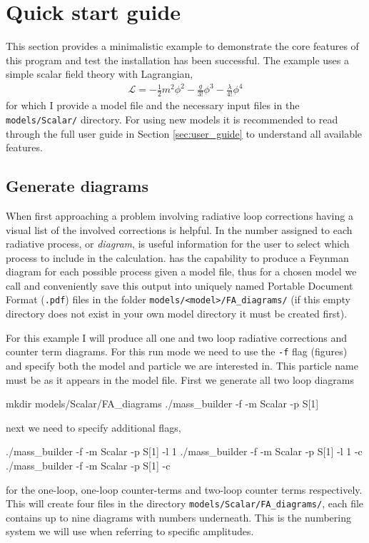\section{Quick start guide}

This section provides a minimalistic example to demonstrate the core features of this program and test the installation has been successful.  The example uses a simple scalar field theory with Lagrangian,
\begin{align}
\mathcal{L} = -\frac{1}{2}m^2\phi^2 - \frac{g}{3!}\phi^3-\frac{\lambda}{4!}\phi^4
\end{align}
for which I provide a \feynarts model file and the necessary \mb input files in the \lstinline{models/Scalar/} directory.  For using new models it is recommended to read through the full user guide in Section \ref{sec:user_guide} to understand all available features.

\subsection{Generate \feynarts diagrams}\label{generate_diagrams}

When first approaching a problem involving radiative loop corrections having a visual list of the involved corrections is helpful.  In \mb the number assigned to each radiative process, or \textit{diagram}, is useful information for the user to select which process to include in the calculation.  \feynarts has the capability to produce a Feynman diagram for each possible process given a model file, thus for a chosen model we call \feynarts and conveniently save this output into uniquely named Portable Document Format (\lstinline{.pdf}) files in the folder \lstinline{models/<model>/FA_diagrams/} (if this empty directory does not exist in your own model directory it must be created first).

For this example I will produce all one and two loop radiative corrections and counter term diagrams.  For this run mode we need to use the \lstinline{-f} flag (figures) and specify both the model and particle we are interested in.  This particle name must be as it appears in the \feynarts model file.  First we generate all two loop diagrams
\begin{lstterm}
mkdir models/Scalar/FA_diagrams
./mass_builder -f -m Scalar -p S[1]
\end{lstterm}
next we need to specify additional flags,
\begin{lstterm}
./mass_builder -f -m Scalar -p S[1] -l 1
./mass_builder -f -m Scalar -p S[1] -l 1 -c
./mass_builder -f -m Scalar -p S[1] -c
\end{lstterm}
for the one-loop, one-loop counter-terms and two-loop counter terms respectively.  This will create four files in the directory \lstinline{models/Scalar/FA_diagrams/}, each file contains up to nine diagrams with numbers underneath.  This is the numbering system we will use when referring to specific amplitudes.

